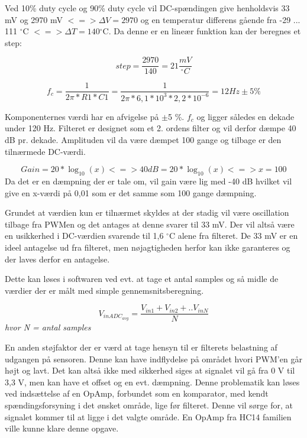 Ved 10\% duty cycle og 90\% duty cycle vil DC-spændingen give henholdsvis 33 mV og 2970 mV $<=> \Delta V = 2970$ og en temperatur differens gående fra -29 ... 111 ${^{\circ}}$C $<=> \Delta T = 140 {^{\circ}}$C. Da denne er en lineær funktion kan der beregnes et step:

\begin{equation}
step = \frac{2970}{140} = 21 \frac{mV}{^{\circ}C}
\end{equation}


\begin{equation}
f_c = \frac{1}{2 \pi * R1 * C1} = \frac{1}{2 \pi * 6,1*10^3  * 2,2*10^{-6}} = 12 Hz\pm5 \%
\end{equation}

Komponenternes værdi har en afvigelse på $\pm$5 \%.
$f_c$ og ligger således en dekade under 120 Hz. Filteret er designet som et 2. ordens filter og vil derfor dæmpe 40 dB pr. dekade. Amplituden vil da være dæmpet 100 gange og tilbage er den tilnærmede DC-værdi. 

\begin{equation}
Gain = 20 * \log_{10}(x) <=> 40 dB = 20 * \log_ {10}(x) <=> x = 100
\end{equation} 
Da det er en dæmpning der er tale om, vil gain være lig med -40 dB hvilket vil give en x-værdi på 0,01 som er det samme som 100 gange dæmpning.

Grundet at værdien kun er tilnærmet skyldes at der stadig vil være oscillation tilbage fra PWMen og det antages at denne svarer til 33 mV. Der vil altså være en usikkerhed i DC-værdien svarende til 1,6 $^{\circ}$C alene fra filteret. De 33 mV er en ideel antagelse ud fra filteret, men nøjagtigheden herfor kan ikke garanteres og der laves derfor en antagelse.

Dette kan løses i softwaren ved evt. at tage et antal samples og så midle de værdier der er målt med simple gennemsnitsberegning. 

\begin{equation}
V_{inADC_{avg}} = \frac{V_{in1} + V_{in2} + .. V_{inN}}{N}
\end{equation} 
\textit{hvor N = antal samples}

En anden støjfaktor der er værd at tage hensyn til er filterets belastning af udgangen på sensoren. Denne kan have indflydelse på området hvori PWM'en går højt og lavt. Det kan altså ikke med sikkerhed siges at signalet vil gå fra 0 V til 3,3 V, men kan have et offset og en evt. dæmpning. Denne problematik kan løses ved indsættelse af en OpAmp, forbundet som en komparator, med kendt spændingsforsyning i det ønsket område, lige før filteret. Denne vil sørge for, at signalet kommer til at ligge i det valgte område. En OpAmp fra HC14 familien ville kunne klare denne opgave. 

